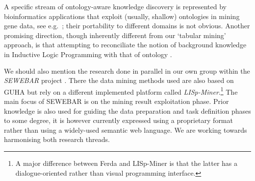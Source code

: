 A specific stream of ontology-aware knowledge discovery is represented by bioinformatics applications that exploit (usually, shallow) ontologies in mining gene data, see e.g.~\cite{Cannataro,Collard}; their portability to different domains is not obvious.
Another promising direction, though inherently different from our `tabular mining' approach, is that attempting to reconciliate the notion of background knowledge in Inductive Logic Programming with that of ontology \cite{Zakova}.

We should also mention the research done in parallel in our own group within the \emph{SEWEBAR} project \cite{SEWEBAR}.
There the data mining methods used are also based on GUHA but rely on a different implemented platform called \emph{LISp-Miner}.\footnote{A major difference between Ferda and LISp-Miner is that the latter has a dialogue-oriented rather than visual programming interface.}
The main focus of SEWEBAR is on the mining result exploitation phase.
Prior knowledge is also used for guiding the data preparation and task definition phases to some degree, it is however currently expressed using a proprietary format rather than using a widely-used semantic web language.
We are working towards harmonising both research threads.

